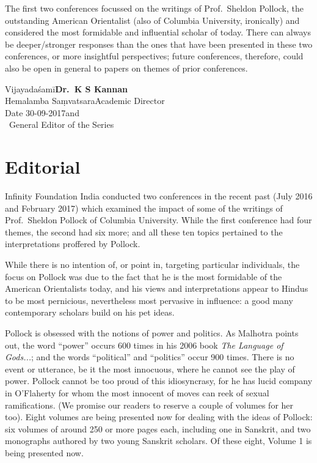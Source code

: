 The first two conferences focussed on the writings of Prof.\ Sheldon Pollock, the outstanding American Orientalist (also of Columbia University, ironically) and considered the most formidable and influential scholar of today. There can always be deeper/stronger responses than the ones that have been presented in these two conferences, or more insightful perspectives; future conferences, therefore, could also be open in general to papers on themes of prior conferences.
\bigskip

\noindent
Vijayadaśamī\hfill	{\bf Dr.~K S Kannan}\\
Hemalamba Saṃvatsara\hfill Academic Director\\
Date 30-09-2017\hfill and\\	
\phantom{.}~\hfill General Editor of the Series                  
               

\chapter*{Editorial}\label{editorial}

\vskip 9pt

Infinity Foundation India conducted two conferences in the recent past (July 2016 and February 2017) which examined the impact of some of the writings of Prof.\ Sheldon Pollock of Columbia University. While the first conference had four themes, the second had six more; and all these ten topics pertained to the interpretations proffered by Pollock.
\vskip 1.5pt

While there is no intention of, or point in, targeting particular individuals, the focus on Pollock was due to the fact that he is the most formidable of the American Orientalists today, and his views and interpretations appear to Hindus to be most pernicious, nevertheless most pervasive in influence: a good many contemporary scholars build on his pet ideas. 
\vskip 1.5pt

Pollock is obsessed with the notions of power and politics. As Malhotra points out, the word “power” occurs 600 times in his 2006 book {\sl The Language of Gods...}; and the words “political” and “politics” occur 900 times. There is no event or utterance, be it the most innocuous, where he cannot see the play of power. Pollock cannot be too proud of this idiosyncrasy, for he has lucid company in O’Flaherty for whom the most innocent of moves can reek of sexual ramifications. (We promise our readers to reserve a couple of volumes for her too). Eight volumes are being presented now for dealing with the ideas of Pollock: six volumes of around 250 or more pages each, including one in Sanskrit, and two monographs authored by two young Sanskrit scholars. Of these eight,  Volume 1 is being presented now.
\vskip 1.5pt

